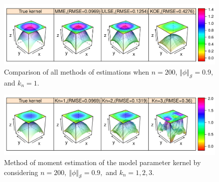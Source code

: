 \documentclass[11pt,a4paper]{article}
\numberwithin{equation}{section}
\begin{document}
\begin{figure}[hb]
\centering
\includegraphics[width=\textwidth]{images/all_methods.png}
\caption{Comparison of all methods of estimations when $n=200$, $\Vert \phi\Vert_\mathcal{S}=0.9$, and $k_n=1$.
\label{fig:compare}}
\end{figure}
\begin{figure}
\centering
\includegraphics[width=\textwidth]{images/MME.png}
\caption{Method of moment estimation of the model parameter kernel by considering $n=200,\ \Vert \phi\Vert_\mathcal{S}=0.9,$ and $k_n=1, 2, 3.$
\label{fig:mme}}
\end{figure}
\end{document}
